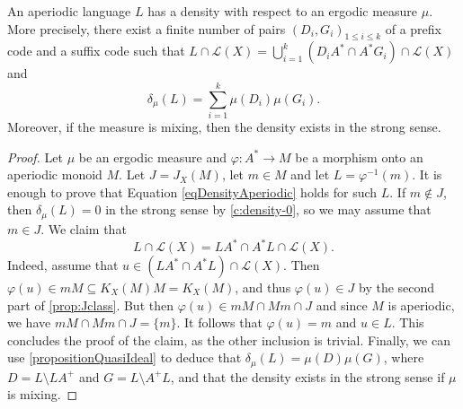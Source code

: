 \documentclass[a4paper,UKenglish,numberwithinsect,cleveref]{lipics-v2021}
\newcommand{\cL}{\mathcal L}
\begin{document}
\begin{theorem}\label{theoremDensityAperiodic}
    An aperiodic language $L$ has a density with respect to an ergodic measure $\mu$.  More precisely, there exist a finite number of pairs $(D_i,G_i)_{1\le i\le k}$ of a prefix code and a suffix code such that $L\cap\cL(X)=\bigcup_{i=1}^k(D_iA^*\cap A^*G_i)\cap \cL(X)$ and
    \begin{equation}
        \delta_\mu(L)=\sum_{i=1}^k\mu(D_i)\mu(G_i).\label{eqDensityAperiodic}
    \end{equation}
    Moreover, if the measure is mixing, then the density exists in the strong sense.
\end{theorem}

\begin{proof}
    Let $\mu$ be an ergodic measure and $\varphi\colon A^*\to M$ be a morphism onto an aperiodic monoid $M$. Let $J=J_X(M)$, let $m\in M$ and let $L=\varphi^{-1}(m)$. It is enough to prove that Equation \eqref{eqDensityAperiodic}
    holds for such $L$. If $m\notin J$, then $\delta_\mu(L)=0$ in the strong sense by \cref{c:density-0}, so we may assume that $m\in J$.  We claim that 
    \[
        L\cap \cL(X)=LA^*\cap A^*L\cap \cL(X).
    \]
    Indeed, assume that $u\in(LA^*\cap A^*L)\cap\cL(X)$. Then $\varphi(u) \in mM \subseteq K_X(M)M = K_X(M)$, and thus $\varphi(u)\in J$ by the second part of \cref{prop:Jclass}. But then $\varphi(u)\in mM\cap Mm\cap J$ and since $M$ is aperiodic, we have $mM\cap Mm\cap J = \{m\}$. It follows that $\varphi(u)=m$ and $u\in L$. This concludes the proof of the claim, as the other inclusion is trivial. Finally, we can use \cref{propositionQuasiIdeal} to deduce that $\delta_\mu(L)=\mu(D)\mu(G)$, where $D=L\setminus LA^+$ and $G=L\setminus A^+L$, and that the density exists in the strong sense if $\mu$ is mixing. 
\end{proof}
\end{document}
